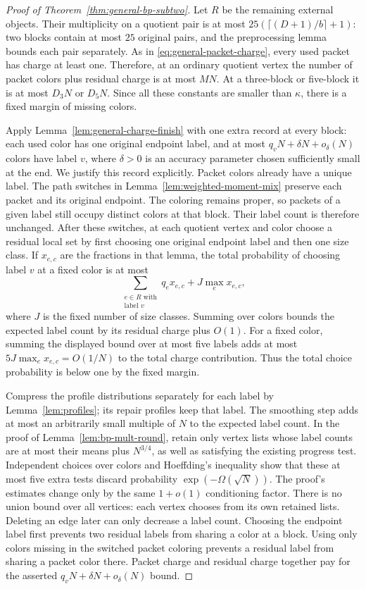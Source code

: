 \documentclass[11pt]{article}
\theoremstyle{definition}\newtheorem{algorithm}{Algorithm}[section]
\numberwithin{equation}{section}
\theoremstyle{remark}\newtheorem*{remark}{Remark}
\begin{document}
\begin{proof}[Proof of Theorem~\ref{thm:general-bp-subtwo}]
Let $R$ be the remaining external objects. Their multiplicity on a quotient pair is at most
$25(\lceil(D+1)/b\rceil+1)$: two blocks contain at most $25$
original pairs, and the preprocessing lemma bounds each pair separately. As in \eqref{eq:general-packet-charge}, every used
packet has charge at least one. Therefore, at an ordinary quotient
vertex the number of packet colors plus residual charge is at
most $MN$. At a three-block or five-block it is at most $D_3N$
or $D_5N$. Since all these constants are smaller than $\kappa$,
there is a fixed margin of missing colors.

Apply Lemma~\ref{lem:general-charge-finish} with one extra record
at every block: each used color has one original endpoint label,
and at most $q_vN+\delta N+o_\delta(N)$ colors have label $v$,
where $\delta>0$ is an accuracy parameter chosen sufficiently small
at the end. We justify this record explicitly.
Packet colors already have a unique label. The path switches in
Lemma~\ref{lem:weighted-moment-mix} preserve each packet and its original
endpoint. The coloring remains proper, so packets of a given label
still occupy distinct colors at that block. Their label count is
therefore unchanged.
After these switches, at each quotient vertex and color choose a
residual local set by first choosing one original endpoint label and
then one size class. If $x_{e,c}$ are the
fractions in that lemma, the total probability of choosing label
$v$ at a fixed color is at most
\[
 \sum_{\substack{e\in R\text{ with}\\\text{label }v}}q_ex_{e,c}
       +J\max_e x_{e,c},
\]
where $J$ is the fixed number of size classes. Summing over colors
bounds the expected label count by its residual charge plus $O(1)$.
For a fixed color, summing the displayed bound over at most five labels
adds at most $5J\max_e x_{e,c}=O(1/N)$ to the total charge contribution.
Thus the total choice probability is below one by the fixed margin.

Compress the profile distributions separately for each label by
Lemma~\ref{lem:profiles}; its repair profiles keep that label.
The smoothing step adds at most an arbitrarily small multiple of
$N$ to the expected label count. In the proof of
Lemma~\ref{lem:bp-mult-round}, retain only vertex lists whose label
counts are at most their means plus $N^{3/4}$, as well as satisfying
the existing progress test. Independent choices over colors and
Hoeffding's inequality show that these at most five extra tests
discard probability $\exp(-\Omega(\sqrt N))$. The proof's estimates
change only by the same $1+o(1)$ conditioning factor. There is no
union bound over all vertices: each vertex chooses from its own
retained lists. Deleting an edge later can only decrease a label
count. Choosing the endpoint label first prevents two residual labels
from sharing a color at a block. Using only colors missing in the
switched packet coloring prevents a residual label from sharing a
packet color there.
Packet charge and residual charge together pay for the asserted
$q_vN+\delta N+o_\delta(N)$ bound.


\end{proof}
\end{document}
